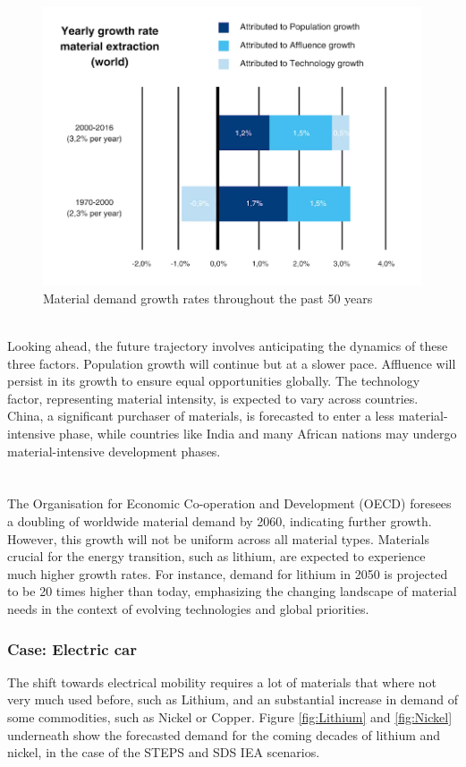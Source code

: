 \documentclass[../summary.tex]{subfiles}
\begin{document}
\begin{figure}[H]
	\centering
	\includegraphics[width=0.7\linewidth]{../images/material_demand_growth_rates}
	\caption{Material demand growth rates throughout the past 50 years}
	\label{fig:materialdemandgrowthrates}
\end{figure}
\ \\
Looking ahead, the future trajectory involves anticipating the dynamics of these three factors. Population growth will continue but at a slower pace. Affluence will persist in its growth to ensure equal opportunities globally. The technology factor, representing material intensity, is expected to vary across countries. China, a significant purchaser of materials, is forecasted to enter a less material-intensive phase, while countries like India and many African nations may undergo material-intensive development phases.\\
\\\\
The Organisation for Economic Co-operation and Development (OECD) foresees a doubling of worldwide material demand by 2060, indicating further growth. However, this growth will not be uniform across all material types. Materials crucial for the energy transition, such as lithium, are expected to experience much higher growth rates. For instance, demand for lithium in 2050 is projected to be 20 times higher than today, emphasizing the changing landscape of material needs in the context of evolving technologies and global priorities.

\subsubsection{Case: Electric car}

The shift towards electrical mobility requires a lot of materials that where not very much used before, such as Lithium, and an substantial increase in demand of some commodities, such as Nickel or Copper. Figure \ref{fig:Lithium} and \ref{fig:Nickel} underneath show the forecasted demand for the coming decades of lithium and nickel, in the case of the STEPS and SDS IEA scenarios.
\end{document}
